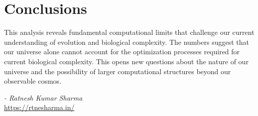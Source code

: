 \documentclass[11pt,a4paper]{article}
\begin{document}
\section{Conclusions}
This analysis reveals fundamental computational limits that challenge our current understanding of evolution and biological complexity. The numbers suggest that our universe alone cannot account for the optimization processes required for current biological complexity. This opens new questions about the nature of our universe and the possibility of larger computational structures beyond our observable cosmos.

\vspace{1cm}
\begin{flushright}
\textit{- Ratnesh Kumar Sharma} \\
\url{https://rtnesharma.in/}
\end{flushright}
\end{document}
